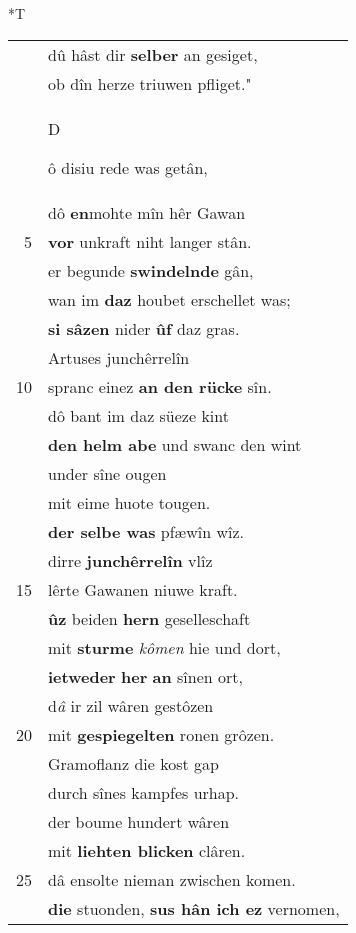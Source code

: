 \documentclass[8pt,a4paper,notitlepage]{article}
\begin{document}
\begin{table}[ht]
\begin{minipage}[t]{0.5\linewidth}
\small
\begin{center}*T
\end{center}
\begin{tabular}{rl}
 & dû hâst dir \textbf{selber} an gesiget,\\ 
 & ob dîn herze triuwen pfliget."\\ 
 & \begin{large}D\end{large}ô disiu rede was getân,\\ 
 & dô \textbf{en}mohte mîn hêr Gawan\\ 
5 & \textbf{vor} unkraft niht langer stân.\\ 
 & er begunde \textbf{swindelnde} gân,\\ 
 & wan im \textbf{daz} houbet erschellet was;\\ 
 & \textbf{si sâzen} nider \textbf{ûf} daz gras.\\ 
 & Artuses junchêrrelîn\\ 
10 & spranc einez \textbf{an den rücke} sîn.\\ 
 & dô bant im daz süeze kint\\ 
 & \textbf{den helm abe} und swanc den wint\\ 
 & under sîne ougen\\ 
 & mit eime huote tougen.\\ 
 & \textbf{der selbe was} pfæwîn wîz.\\ 
 & dirre \textbf{junchêrrelîn} vlîz\\ 
15 & lêrte Gawanen niuwe kraft.\\ 
 & \textbf{ûz} beiden \textbf{hern} geselleschaft\\ 
 & mit \textbf{sturme} \textit{kômen} hie und dort,\\ 
 & \textbf{ietweder} \textbf{her} \textbf{an} sînen ort,\\ 
 & d\textit{â} ir zil wâren gestôzen\\ 
20 & mit \textbf{gespiegelten} ronen grôzen.\\ 
 & Gramoflanz die kost gap\\ 
 & durch sînes kampfes urhap.\\ 
 & der boume hundert wâren\\ 
 & mit \textbf{liehten blicken} clâren.\\ 
25 & dâ ensolte nieman zwischen komen.\\ 
 & \textbf{die} stuonden, \textbf{sus hân ich ez} vernomen,\\ 

\end{tabular}
\end{minipage}
\end{table}
\end{document}

